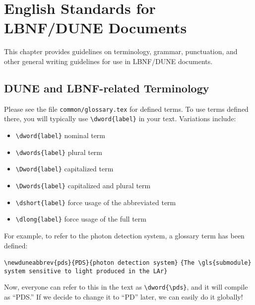 \chapter{English Standards for LBNF/DUNE Documents}
\label{ch:english}

This chapter provides guidelines on terminology, grammar, punctuation, and other general writing guidelines for use in LBNF/DUNE documents. 


\section{DUNE and LBNF-related Terminology}
\label{sec:english-terminology}

Please see the file \verb|common/glossary.tex| for defined terms. To use terms defined there, you will typically use \verb|\dword{label}| in your text.  Variations include:

\begin{itemize}
\item \verb|\dword{label}| nominal term
\item \verb|\dwords{label}| plural term
\item \verb|\Dword{label}| capitalized term
\item \verb|\Dwords{label}| capitalized and plural term
\item \verb|\dshort{label}| force usage of the abbreviated term
\item \verb|\dlong{label}| force usage of the full term
\end{itemize}

For example, to refer to the photon detection system, a glossary term has been defined:

\verb|\newduneabbrev{pds}{PDS}{photon detection system}|
\verb|{The \gls{submodule} system sensitive to light produced in the LAr}|

Now, everyone can refer to this in the text as \verb|\dword{\pds}|, and it will compile as ``PDS.''  If we decide to change it to ``PD'' later, we can easily do it globally!

